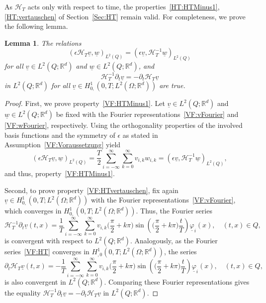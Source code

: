 \documentclass[a4paper,11pt]{article}
\newtheorem{lemma}[theorem]{Lemma}
\newcommand{\R}{\mathbb R}
\renewcommand{\vec}[1]{\underline{#1}}
\begin{document}
As $\mathcal H_T$ acts only with respect to time, the properties~\eqref{HT:HTMinus1}, \eqref{HT:vertauschen} of Section~\ref{Sec:HT} remain valid. For completeness, we prove the following lemma.
\begin{lemma}
	The relations
	\begin{equation} \label{VF:HTMinus1}
		( \epsilon {\mathcal{H}_T} \vec v , \vec w )_{L^2(Q)} = (\epsilon \vec v , {\mathcal{H}}_T^{-1} \vec w )_{L^2(Q)}
	\end{equation}
	for all $\vec v \in L^2(Q;\R^d)$ and $ \vec w \in L^2(Q;\R^d)$, and 
	\begin{equation} \label{VF:HTvertauschen}
		\mathcal H_T^{-1}\partial_t \vec v = - \partial_t \mathcal H_T \vec v
	\end{equation}
	in $L^2(Q;\R^d)$  for all  $\vec v \in H^1_{0,}(0,T;L^2(\Omega;\R^d))$ are true.
\end{lemma}
\begin{proof}
	First, we prove property~\eqref{VF:HTMinus1}. Let $\vec v \in L^2(Q;\R^d)$ and $\vec w \in L^2(Q;\R^d)$ be fixed with the Fourier representations~\eqref{VF:vFourier} and \eqref{VF:wFourier}, respectively. Using the orthogonality properties of the involved basis functions and the symmetry of $\epsilon$ as stated in Assumption~\ref{VF:Voraussetzung} yield
	\begin{equation*}
		( \epsilon {\mathcal{H}_T} \vec v , \vec w )_{L^2(Q)} = \frac T 2 \sum_{i=-\infty}^\infty \sum_{k=0}^\infty v_{i,k} w_{i,k} = (\epsilon \vec v , {\mathcal{H}}_T^{-1} \vec w )_{L^2(Q)},
	\end{equation*}
	and thus, property~\eqref{VF:HTMinus1}.
	
	Second, to prove property~\eqref{VF:HTvertauschen}, fix again $\vec v \in H^1_{0,}(0,T;L^2(\Omega;\R^d))$ with the Fourier representations~\eqref{VF:vFourier}, which converges in $H^1_{0,}(0,T;L^2(\Omega;\R^d))$. Thus, the Fourier series
	\begin{equation*}
		\mathcal H_T^{-1}\partial_t \vec v(t,x) = \frac 1 T \sum_{i=-\infty}^\infty \sum_{k=0}^\infty v_{i,k} \Big( \frac{\pi}{2} + k\pi \Big) \sin \left( \Big( \frac{\pi}{2} + k\pi \Big) \frac{t}{T} \right) \vec \varphi_i(x), \quad (t,x) \in Q,
	\end{equation*}  
	is convergent with respect to $L^2(Q;\R^d)$. Analogously, as the Fourier series~\eqref{VF:HT} converges in $H^1_{,0}(0,T;L^2(\Omega;\R^d))$, the series
	\begin{equation*}
		\partial_t \mathcal H_T \vec v(t,x) = -\frac 1 T \sum_{i=-\infty}^\infty \sum_{k=0}^\infty v_{i,k} \Big( \frac{\pi}{2} + k\pi \Big) \sin \left( \Big( \frac{\pi}{2} + k\pi \Big) \frac{t}{T} \right) \vec \varphi_i(x), \quad (t,x) \in Q,
	\end{equation*}
	is also convergent in $L^2(Q;\R^d)$. Comparing these Fourier representations gives the equality $\mathcal H_T^{-1}\partial_t \vec v = - \partial_t \mathcal H_T \vec v$ in $L^2(Q;\R^d)$.
\end{proof}
\end{document}
